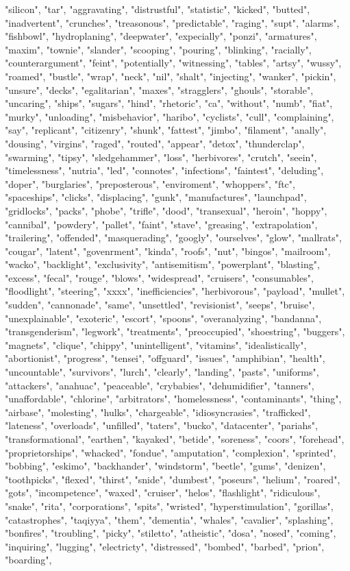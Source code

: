 "silicon", "tar", "aggravating", "distrustful", "statistic", "kicked", "butted", "inadvertent", "crunches", "treasonous", "predictable", "raging", "supt", "alarms", "fishbowl", "hydroplaning", "deepwater", "expecially", "ponzi", "armatures", "maxim", "townie", "slander", "scooping", "pouring", "blinking", "racially", "counterargument", "feint", "potentially", "witnessing", "tables", "artsy", "wussy", "roamed", "bustle", "wrap", "neck", "nil", "shalt", "injecting", "wanker", "pickin", "unsure", "decks", "egalitarian", "maxes", "stragglers", "ghouls", "storable", "uncaring", "ships", "sugars", "hind", "rhetoric", "ca", "without", "numb", "fiat", "murky", "unloading", "misbehavior", "haribo", "cyclists", "cull", "complaining", "say", "replicant", "citizenry", "shunk", "fattest", "jimbo", "filament", "anally", "dousing", "virgins", "raged", "routed", "appear", "detox", "thunderclap", "swarming", "tipsy", "sledgehammer", "loss", "herbivores", "crutch", "seein", "timelessness", "nutria", "led", "connotes", "infections", "faintest", "deluding", "doper", "burglaries", "preposterous", "enviroment", "whoppers", "ftc", "spaceships", "clicks", "displacing", "gunk", "manufactures", "launchpad", "gridlocks", "packs", "phobe", "trifle", "dood", "transexual", "heroin", "hoppy", "cannibal", "powdery", "pallet", "faint", "stave", "greasing", "extrapolation", "trailering", "offended", "masquerading", "googly", "ourselves", "glow", "mallrats", "cougar", "latent", "govenrment", "kinda", "roofs", "nut", "bingos", "mailroom", "wacko", "backlight", "exclusivity", "antisemitism", "powerplant", "blasting", "excess", "fecal", "rouge", "blows", "widespread", "cruisers", "consumables", "floodlight", "steering", "xxxx", "inefficiencies", "herbivorous", "payload", "mullet", "sudden", "cannonade", "same", "unsettled", "revisionist", "seeps", "bruise", "unexplainable", "exoteric", "escort", "spoons", "overanalyzing", "bandanna", "transgenderism", "legwork", "treatments", "preoccupied", "shoestring", "buggers", "magnets", "clique", "chippy", "unintelligent", "vitamins", "idealistically", "abortionist", "progress", "tensei", "offguard", "issues", "amphibian", "health", "uncountable", "survivors", "lurch", "clearly", "landing", "pasts", "uniforms", "attackers", "anahuac", "peaceable", "crybabies", "dehumidifier", "tanners", "unaffordable", "chlorine", "arbitrators", "homelessness", "contaminants", "thing", "airbase", "molesting", "hulks", "chargeable", "idiosyncrasies", "trafficked", "lateness", "overloads", "unfilled", "taters", "bucko", "datacenter", "pariahs", "transformational", "earthen", "kayaked", "betide", "soreness", "coors", "forehead", "proprietorships", "whacked", "fondue", "amputation", "complexion", "sprinted", "bobbing", "eskimo", "backhander", "windstorm", "beetle", "gums", "denizen", "toothpicks", "flexed", "thirst", "snide", "dumbest", "poseurs", "helium", "roared", "gots", "incompetence", "waxed", "cruiser", "helos", "flashlight", "ridiculous", "snake", "rita", "corporations", "spits", "wristed", "hyperstimulation", "gorillas", "catastrophes", "taqiyya", "them", "dementia", "whales", "cavalier", "splashing", "bonfires", "troubling", "picky", "stiletto", "atheistic", "dosa", "nosed", "coming", "inquiring", "lugging", "electricty", "distressed", "bombed", "barbed", "prion", "boarding", 